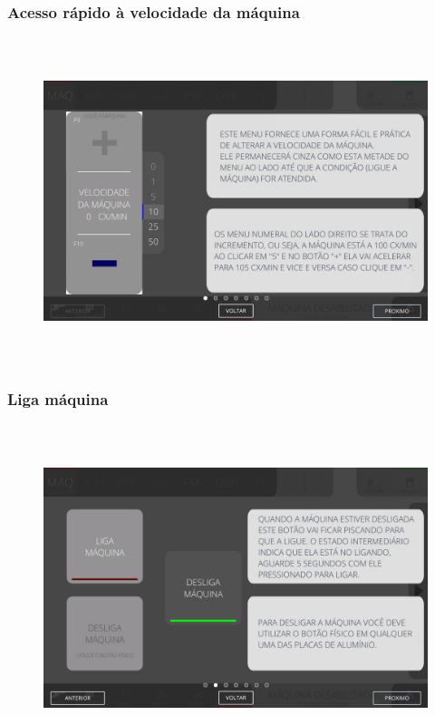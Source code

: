 \subsubsection{\small{Acesso rápido à velocidade da máquina}}\label{telaComandosMaquinaAcessoRapidoAVeocidadeDaMaquina}

\vspace*{\fill}

\begin{figure}[h]
  \centering
  \includegraphics[width=576px,height=360px]{src/imagesFlexo/02-machine/e-1.png}
\end{figure}

\vspace*{\fill}

\newpage
\thispagestyle{fancy}

\vspace*{40 pt}

\subsubsection{\small{Liga máquina}}\label{telaComandosMaquinaLigaMaquina}

\vspace*{\fill}

\begin{figure}[h]
  \centering
  \includegraphics[width=576px,height=360px]{src/imagesFlexo/02-machine/e-2.png}
\end{figure}

